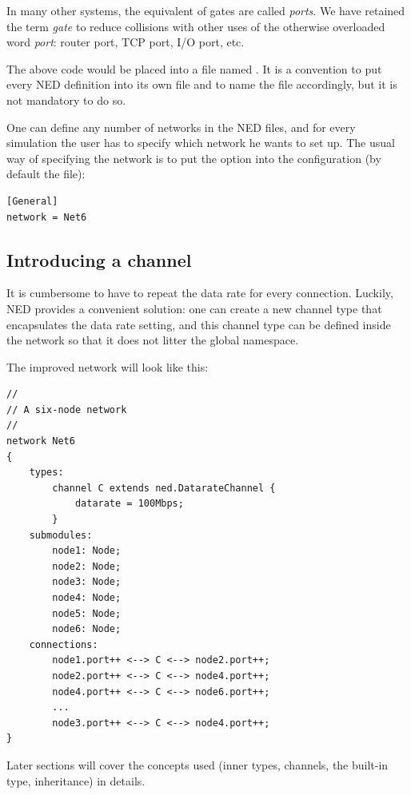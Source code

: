 \begin{note}
    In many other systems, the equivalent of {\opp} gates are called
    \textit{ports}. We have retained the term \textit{gate} to reduce
    collisions with other uses of the otherwise overloaded word
    \textit{port}: router port, TCP port, I/O port, etc.
\end{note}

The above code would be placed into a file named . It is
a convention to put every NED definition into its own file and to name the
file accordingly, but it is not mandatory to do so.

One can define any number of networks in the NED files, and for every
simulation the user has to specify which network he wants to set up.
The usual way of specifying the network is to put the 
option into the configuration (by default the  file):

\begin{Verbatim}
[General]
network = Net6
\end{Verbatim}


\subsection{Introducing a channel}

It is cumbersome to have to repeat the data rate for every connection.
Luckily, NED provides a convenient solution: one can create a new channel
type that encapsulates the data rate setting, and this channel type can
be defined inside the network so that it does not litter the global
namespace.

The improved network will look like this:

\begin{Verbatim}
//
// A six-node network
//
network Net6
{
    types:
        channel C extends ned.DatarateChannel {
            datarate = 100Mbps;
        }
    submodules:
        node1: Node;
        node2: Node;
        node3: Node;
        node4: Node;
        node5: Node;
        node6: Node;
    connections:
        node1.port++ <--> C <--> node2.port++;
        node2.port++ <--> C <--> node4.port++;
        node4.port++ <--> C <--> node6.port++;
        ...
        node3.port++ <--> C <--> node4.port++;
}
\end{Verbatim}

Later sections will cover the concepts used (inner types, channels, the
 built-in type, inheritance) in details.


